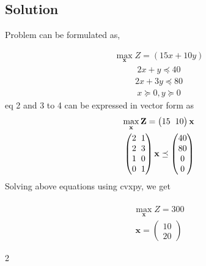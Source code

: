 \documentclass{article}
\newcommand{\myvec}[1]{\ensuremath{\begin{pmatrix}#1\end{pmatrix}}}
\let\vec\mathbf
\begin{document}
\begin{multicols}{2}
\section*{Solution}
\begin{flushleft}
Problem can be formulated as,\\
\end{flushleft}
\begin{align}
\max_{\vec{x}} Z=(15x+10y)
\end{align}
\begin{align}
2x+y \preceq40
\end{align}
\begin{align}
2x+3y \preceq 80
\end{align}
\begin{align}
x\succeq0,y\succeq0
\end{align}
eq 2 and 3 to 4 can be expressed in vector form as
\begin{align*}
\max_{\vec{x}}\vec{Z}=\myvec{15 \hspace{0.2cm}10}\vec{x}\\
\myvec{2 \hspace{0.2cm} 1\\
       2 \hspace{0.2cm} 3\\
       1 \hspace{0.2cm}0\\
       0 \hspace{0.2cm} 1}\vec{x}\preceq \myvec{40 \\80\\0\\0}
\end{align*}
Solving above equations using cvxpy, we get\\
\vspace{0.1cm}\\
\begin{align}
\max_{\vec{x}} Z=300
\end{align}
\begin{align}
\vec{x}=\myvec{10\\20}
\end{align}
\end{multicols}{2}
\end{document}
